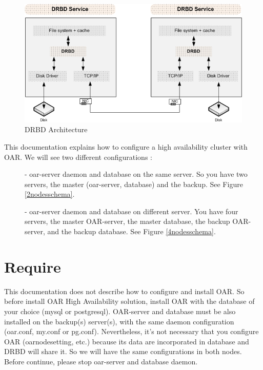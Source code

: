\documentclass[a4paper,10pt]{report}
\begin{document}
\begin{figure}
\begin{center}
\includegraphics[scale=0.5]{schema/DRBD.png}
\end{center}
\caption{DRBD Architecture} 
\label{drbd} 
\end{figure} 



This documentation explains how to configure a high availability cluster with OAR. We will see two different configurations :
\begin{description}
\item[]- oar-server daemon and database on the same server. So you have two servers, the master (oar-server, database) and the backup. See Figure \ref{2nodesschema}.


\item[]- oar-server daemon and database on different server. You have four servers, the master OAR-server, the master database, the backup OAR-server, and the backup database.
See Figure \ref{4nodesschema}.

\end{description}


\section{Require}
This documentation does not describe how to configure and install OAR. So before install OAR High Availability solution, 
install OAR with the database of your choice (mysql or postgresql). OAR-server and database must be also installed on the backup(s) server(s), 
with the same daemon configuration (oar.conf, my.conf or pg.conf). 
Nevertheless, it's not necessary that you configure OAR (oarnodesetting, etc.) because its data are incorporated in database and DRBD will share it. So we will have the same configurations in both nodes.
Before continue, please stop oar-server and database daemon.
\end{document}
